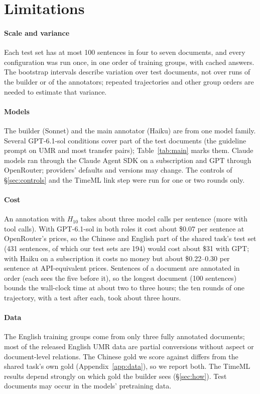 \section*{Limitations}
\label{sec:limitations}

\paragraph{Scale and variance} Each test set has at most 100 sentences in four to seven documents, and every configuration was run once, in one order of training groups, with cached answers. The bootstrap intervals describe variation over test documents, not over runs of the builder or of the annotators; repeated trajectories and other group orders are needed to estimate that variance.

\paragraph{Models} The builder (Sonnet) and the main annotator (Haiku) are from one model family. Several GPT-6.1-sol conditions cover part of the test documents (the guideline prompt on UMR and most transfer pairs); Table~\ref{tab:main} marks them. Claude models ran through the Claude Agent SDK on a subscription and GPT through OpenRouter; providers' defaults and versions may change. The controls of \S\ref{sec:controls} and the TimeML link step were run for one or two rounds only.

\paragraph{Cost} An annotation with $H_{10}$ takes about three model calls per sentence (more with tool calls). With GPT-6.1-sol in both roles it cost about \$0.07 per sentence at OpenRouter's prices, so the Chinese and English part of the shared task's test set (431 sentences, of which our test sets are 194) would cost about \$31 with GPT; with Haiku on a subscription it costs no money but about \$0.22--0.30 per sentence at API-equivalent prices. Sentences of a document are annotated in order (each sees the five before it), so the longest document (100 sentences) bounds the wall-clock time at about two to three hours; the ten rounds of one trajectory, with a test after each, took about three hours.

\paragraph{Data} The English training groups come from only three fully annotated documents; most of the released English UMR data are partial conversions without aspect or document-level relations. The Chinese gold we score against differs from the shared task's own gold (Appendix~\ref{app:data}), so we report both. The TimeML results depend strongly on which gold the builder sees (\S\ref{sec:how}). Test documents may occur in the models' pretraining data.

